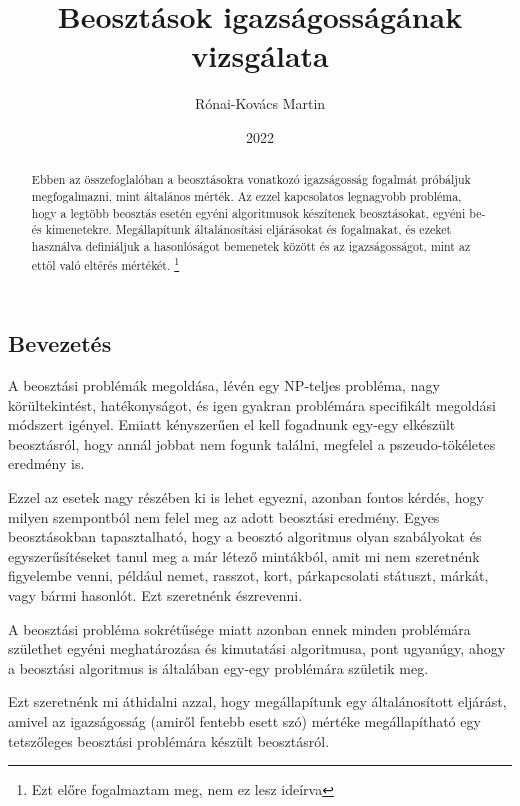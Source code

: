 \documentclass{article}
\title{Beosztások igazságosságának vizsgálata}
\author{Rónai-Kovács Martin}
\date{2022}
\theoremstyle{definition}
\begin{document}
\maketitle

\begin{multicols}{2}


    \begin{abstract}
        Ebben az összefoglalóban a beosztásokra vonatkozó igazságosság fogalmát próbáljuk megfogalmazni, mint általános mérték. Az ezzel kapcsolatos legnagyobb probléma, hogy a legtöbb beosztás esetén egyéni algoritmusok készítenek beosztásokat, egyéni be- és kimenetekre. Megállapítunk általánosítási eljárásokat és fogalmakat, és ezeket használva definiáljuk a hasonlóságot bemenetek között és az igazságosságot, mint az ettől való eltérés mértékét. \footnote{Ezt előre fogalmaztam meg, nem ez lesz ideírva}
    \end{abstract}

\section{Bevezetés}
    A beosztási problémák megoldása, lévén egy NP-teljes probléma, nagy körültekintést, hatékonyságot, és igen gyakran problémára specifikált megoldási módszert igényel. Emiatt kényszerűen el kell fogadnunk egy-egy elkészült beosztásról, hogy annál jobbat nem fogunk találni, megfelel a pszeudo-tökéletes eredmény is. 
    
    Ezzel az esetek nagy részében ki is lehet egyezni, azonban fontos kérdés, hogy milyen szempontból nem felel meg az adott beosztási eredmény. Egyes beosztásokban tapasztalható, hogy a beosztó algoritmus olyan szabályokat és egyszerűsítéseket tanul meg a már létező mintákból, amit mi nem szeretnénk figyelembe venni, például nemet, rasszot, kort, párkapcsolati státuszt, márkát, vagy bármi hasonlót. Ezt szeretnénk észrevenni.
    
    A beosztási probléma sokrétűsége miatt azonban ennek minden problémára születhet egyéni meghatározása és kimutatási algoritmusa, pont ugyanúgy, ahogy a beosztási algoritmus is általában egy-egy problémára születik meg.
    
    Ezt szeretnénk mi áthidalni azzal, hogy megállapítunk egy általánosított eljárást, amivel az igazságosság (amiről fentebb esett szó) mértéke megállapítható egy tetszőleges beosztási problémára készült beosztásról.
    

\end{multicols}
\end{document}
